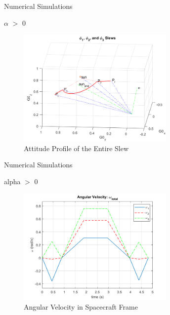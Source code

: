 \documentclass{beamer}
\begin{document}
\begin{frame}{Numerical Simulations}
	\begin{block}{$\alpha$ $>$ 0}
		\begin{figure}[H]
			\label{fig:phi1_phi2_phi3}
			\includegraphics[width=3in]{figures/alphaNot0/phi1_phi2_phi3.png}
			\caption{Attitude Profile of the Entire Slew}
		\end{figure}
	\end{block}
\end{frame}
\begin{frame}{Numerical Simulations}
	\begin{block}{alpha $>$ 0}
		
		
		\begin{figure}[H]
			\label{fig:ang_vel_phi_total}
			\begin{center}
				\includegraphics[width=3in]{figures/alphaNot0/ang_vel_phi_total.png}
			\end{center}
			\caption{Angular Velocity in Spacecraft Frame}
		\end{figure}
	\end{block}
\end{frame}
\end{document}
